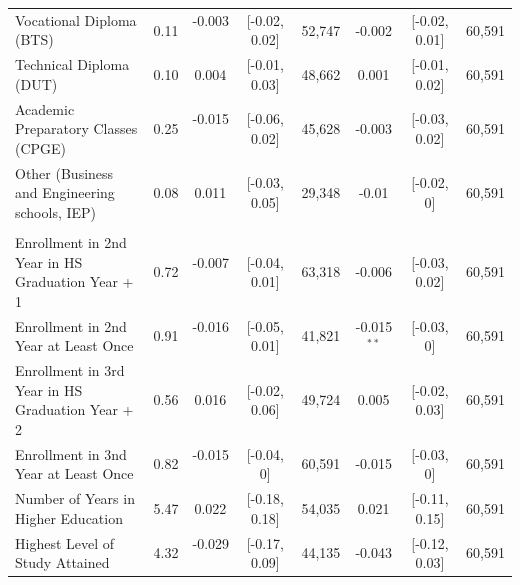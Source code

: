 \begin{table}[!h]
{\begin{threeparttable}
\begin{tabular}[t]{lccccccc}
\addlinespace[\smallskipamount]
\hspace{1em}Vocational Diploma (BTS) & 0.11 & -0.003$^{}$ & {}[-0.02, 0.02] & 52,747 & -0.002$^{}$ & {}[-0.02, 0.01] & 60,591\\
\addlinespace[\smallskipamount]
\hspace{1em}Technical Diploma (DUT) & 0.10 & 0.004$^{}$ & {}[-0.01, 0.03] & 48,662 & 0.001$^{}$ & {}[-0.01, 0.02] & 60,591\\
\addlinespace[\smallskipamount]
\hspace{1em}Academic Preparatory Classes (CPGE) & 0.25 & -0.015$^{}$ & {}[-0.06, 0.02] & 45,628 & -0.003$^{}$ & {}[-0.03, 0.02] & 60,591\\
\addlinespace[\smallskipamount]
\hspace{1em}Other (Business and Engineering schools, IEP) & 0.08 & 0.011$^{}$ & {}[-0.03, 0.05] & 29,348 & -0.01$^{}$ & {}[-0.02, 0] & 60,591\\
\addlinespace[\smallskipamount]
\addlinespace[0.3em]
\multicolumn{8}{l}{\textit{Panel C. Persistence}}\\
\hspace{1em}Enrollment in 2nd Year in HS Graduation Year + 1 & 0.72 & -0.007$^{}$ & {}[-0.04, 0.01] & 63,318 & -0.006$^{}$ & {}[-0.03, 0.02] & 60,591\\
\addlinespace[\smallskipamount]
\hspace{1em}Enrollment in 2nd Year at Least Once & 0.91 & -0.016$^{}$ & {}[-0.05, 0.01] & 41,821 & -0.015$^{**}$ & {}[-0.03, 0] & 60,591\\
\addlinespace[\smallskipamount]
\hspace{1em}Enrollment in 3rd Year in HS Graduation Year + 2 & 0.56 & 0.016$^{}$ & {}[-0.02, 0.06] & 49,724 & 0.005$^{}$ & {}[-0.02, 0.03] & 60,591\\
\addlinespace[\smallskipamount]
\hspace{1em}Enrollment in 3nd Year at Least Once & 0.82 & -0.015$^{}$ & {}[-0.04, 0] & 60,591 & -0.015$^{}$ & {}[-0.03, 0] & 60,591\\
\addlinespace[\smallskipamount]
\hspace{1em}Number of Years in Higher Education & 5.47 & 0.022$^{}$ & {}[-0.18, 0.18] & 54,035 & 0.021$^{}$ & {}[-0.11, 0.15] & 60,591\\
\addlinespace[\smallskipamount]
\hspace{1em}Highest Level of Study Attained & 4.32 & -0.029$^{}$ & {}[-0.17, 0.09] & 44,135 & -0.043$^{}$ & {}[-0.12, 0.03] & 60,591\\

\end{tabular}
\end{threeparttable}}
\end{table}
